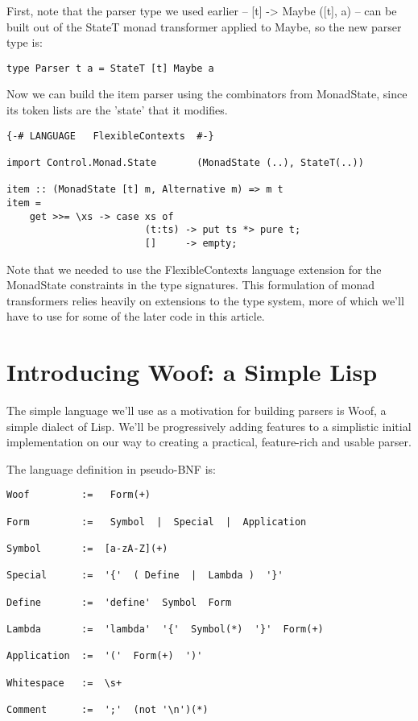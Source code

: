 \documentclass{tmr}
\begin{document}
First, note that the parser type we used earlier -- [t] -> Maybe ([t], a) -- 
can be built out of the StateT monad transformer applied to Maybe, so the new
parser type is:
\begin{verbatim}
type Parser t a = StateT [t] Maybe a
\end{verbatim}
Now we can build the item parser using the combinators from MonadState, since
its token lists are the 'state' that it modifies.
\begin{verbatim}
{-# LANGUAGE   FlexibleContexts  #-}

import Control.Monad.State       (MonadState (..), StateT(..))

item :: (MonadState [t] m, Alternative m) => m t
item =
    get >>= \xs -> case xs of
                        (t:ts) -> put ts *> pure t;
                        []     -> empty;
\end{verbatim}
Note that we needed to use the FlexibleContexts language extension for the 
MonadState constraints in the type signatures.  This formulation of monad
transformers relies heavily on extensions to the type system, more of which 
we'll have to use for some of the later code in this article.




\section{Introducing Woof:  a Simple Lisp}
The simple language we'll use as a motivation for building parsers is 
Woof, a simple dialect of Lisp.  We'll be 
progressively adding features to a simplistic initial implementation
on our way to creating a practical, feature-rich and usable parser.

The language definition in pseudo-BNF is:

\begin{verbatim}
Woof         :=   Form(+)

Form         :=   Symbol  |  Special  |  Application

Symbol       :=  [a-zA-Z](+)

Special      :=  '{'  ( Define  |  Lambda )  '}'

Define       :=  'define'  Symbol  Form

Lambda       :=  'lambda'  '{'  Symbol(*)  '}'  Form(+)

Application  :=  '('  Form(+)  ')'

Whitespace   :=  \s+

Comment      :=  ';'  (not '\n')(*)
\end{verbatim}
\end{document}
